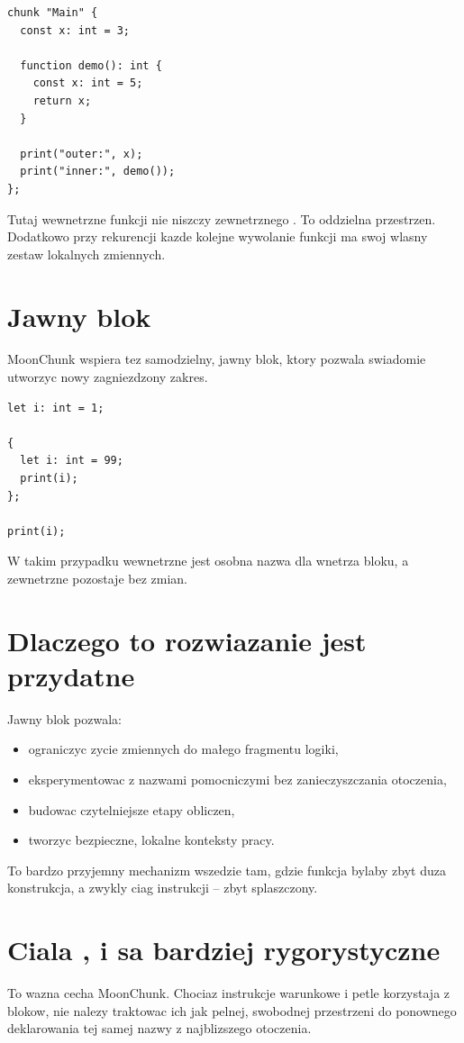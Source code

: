 \begin{lstlisting}[style=moonchunk,caption={Ta sama nazwa na zewnatrz i wewnatrz funkcji}]
chunk "Main" {
  const x: int = 3;

  function demo(): int {
    const x: int = 5;
    return x;
  }

  print("outer:", x);
  print("inner:", demo());
};
\end{lstlisting}

Tutaj wewnetrzne  funkcji nie niszczy zewnetrznego . To oddzielna przestrzen.
Dodatkowo przy rekurencji kazde kolejne wywolanie funkcji ma swoj wlasny zestaw lokalnych
zmiennych.

\section{Jawny blok }
MoonChunk wspiera tez samodzielny, jawny blok, ktory pozwala swiadomie utworzyc nowy
zagniezdzony zakres.

\begin{lstlisting}[style=moonchunk,caption={Jawny blok jako osobny zakres}]
let i: int = 1;

{
  let i: int = 99;
  print(i);
};

print(i);
\end{lstlisting}

W takim przypadku wewnetrzne  jest osobna nazwa dla wnetrza bloku, a zewnetrzne
 pozostaje bez zmian.

\section{Dlaczego to rozwiazanie jest przydatne}
Jawny blok pozwala:

\begin{itemize}
  \item ograniczyc zycie zmiennych do małego fragmentu logiki,
  \item eksperymentowac z nazwami pomocniczymi bez zanieczyszczania otoczenia,
  \item budowac czytelniejsze etapy obliczen,
  \item tworzyc bezpieczne, lokalne konteksty pracy.
\end{itemize}

To bardzo przyjemny mechanizm wszedzie tam, gdzie funkcja bylaby zbyt duza konstrukcja,
a zwykly ciag instrukcji -- zbyt splaszczony.

\section{Ciala ,  i  sa bardziej rygorystyczne}
To wazna cecha MoonChunk. Chociaz instrukcje warunkowe i petle korzystaja z blokow,
nie nalezy traktowac ich jak pelnej, swobodnej przestrzeni do ponownego deklarowania
tej samej nazwy z najblizszego otoczenia.

